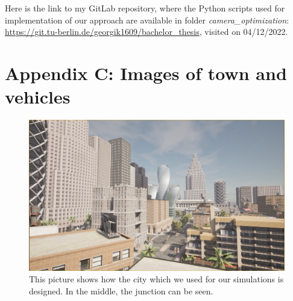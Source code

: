 Here is the link to my GitLab repository, where the Python scripts used for implementation of our approach are available in folder \textit{camera\_optimization}: \url{https://git.tu-berlin.de/georgik1609/bachelor_thesis}, visited on 04/12/2022.

\newpage
{}
\section*{Appendix C: Images of town and vehicles}
\begin{figure} [h]
    \centering
    \includegraphics[width=\textwidth]{images/experiment_city.png}
    \caption[Environment for experiments]{This picture shows how the city which we used for our simulations is designed. In the middle, the junction can be seen.}
    \label{fig:city_experiments}
\end{figure}


% 

